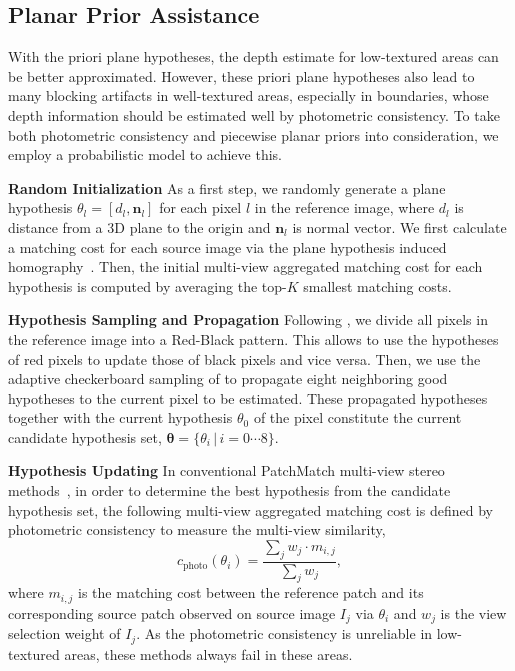 \documentclass[letterpaper]{article} %
\begin{document}
\subsection{Planar Prior Assistance}

With the priori plane hypotheses, the depth estimate for low-textured areas can be better approximated. However, these priori plane hypotheses also lead to many blocking artifacts in well-textured areas, especially in boundaries, whose depth information should be estimated well by photometric consistency. To take both photometric consistency and piecewise planar priors into consideration, we employ a probabilistic model to achieve this.

\noindent\textbf{Random Initialization} As a first step, we randomly generate a plane hypothesis $\theta_{l}=[d_{l},\boldsymbol{n}_{l}]$ for each pixel ${l}$ in the reference image, where $d_{l}$ is distance from a 3D plane to the origin and $\boldsymbol{n}_{l}$ is normal vector. We first calculate a matching cost for each source image via the plane hypothesis induced homography~\cite{Hartley2004Multiple}. Then, the initial multi-view aggregated matching cost for each hypothesis is computed by averaging the top-$K$ smallest matching costs.

\noindent\textbf{Hypothesis Sampling and Propagation} Following \cite{Galliani2015Massively,Xu2018Multi}, we divide all pixels in the reference image into a Red-Black pattern. This allows to use the hypotheses of red pixels to update those of black pixels and vice versa. Then, we use the adaptive checkerboard sampling of \cite{Xu2018Multi} to propagate eight neighboring good hypotheses to the current pixel to be estimated. These propagated hypotheses together with the current hypothesis $\theta_{0}$ of the pixel constitute the current candidate hypothesis set, $\boldsymbol{\theta}=\{\theta_{i}\,|\,i=0\cdots8\}$.   

\noindent\textbf{Hypothesis Updating} In conventional PatchMatch multi-view stereo methods~\cite{Zheng2014PatchMatch,Schonberger2016Pixelwise,Xu2018Multi}, in order to determine the best hypothesis from the candidate hypothesis set, the following multi-view aggregated matching cost is defined by photometric consistency to measure the multi-view similarity, 
\begin{equation}\label{eq:1}
c_{\text{photo}}(\theta_{i})=\frac{\sum_{j} w_{j}\cdot m_{i,j}}{\sum_{j} w_{j}},
\end{equation}
where $m_{i,j}$ is the matching cost between the reference patch and its corresponding source patch observed on source image $I_{j}$ via $\theta_{i}$ and $w_{j}$ is the view selection weight of $I_{j}$. As the photometric consistency is unreliable in low-textured areas, these methods always fail in these areas.
\end{document}
